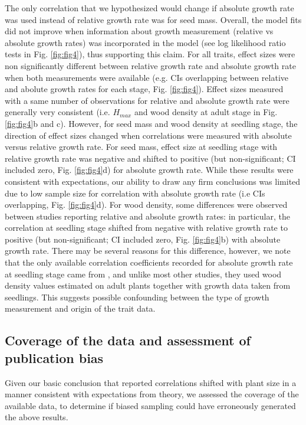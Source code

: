 \documentclass[a4paper,11pt]{article}
\begin{document}
The only correlation that we hypothesized would change if absolute growth rate was used instead of relative growth rate was for seed mass. Overall, the model fits did not improve when information about growth measurement (relative vs absolute growth rates) was incorporated in the model (see log likelihood ratio tests in Fig. \ref{fig:fig4}), thus supporting this claim. For all traits, effect sizes were non significantly different between relative growth rate and absolute growth rate when both measurements were available (e.g. CIs overlapping between relative and abolute growth rates for each stage, Fig. \ref{fig:fig4}). Effect sizes measured with a same number of observations for relative and absolute growth rate were generally very consistent (i.e. $H_{max}$ and wood density at adult stage in Fig. \ref{fig:fig4}b and c). However, for seed mass and wood density at seedling stage, the direction of effect sizes changed when correlations were measured with absolute versus relative growth rate. For seed mass, effect size at seedling stage with relative growth rate was negative and shifted to positive (but non-significant; CI included zero, Fig. \ref{fig:fig4}d) for absolute growth rate. While these results were consistent with expectations, our ability to draw any firm conclusions was limited due to low sample size for correlation with absolute growth rate (i.e CIs overlapping, Fig. \ref{fig:fig4}d). For wood density, some differences were observed between studies reporting relative and absolute growth rates: in particular, the correlation at seedling stage shifted from negative with relative growth rate to positive (but non-significant; CI included zero, Fig. \ref{fig:fig4}b) with absolute growth rate. There may be several reasons for this difference, however, we note that the only available correlation coefficients recorded for absolute growth rate at seedling stage came from \citet{Augspurger:1984ct}, and unlike most other studies, they used wood density values estimated on adult plants together with growth data taken from seedlings. This suggests possible confounding between the type of growth measurement and origin of the trait data.

\subsection*{Coverage of the data and assessment of publication bias}

Given our basic conclusion that reported correlations shifted with plant size in a manner consistent with expectations from theory, we assessed the coverage of the available data, to determine if biased sampling could have erroneously generated the above results.
\end{document}
